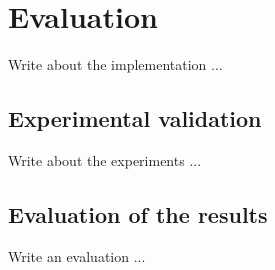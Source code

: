 \chapter{Evaluation}
\label{cha:evaluation}
\vspace{0.5 cm} 

Write about the implementation ...

\vspace{0.5 cm} 
\section{Experimental validation}
\label{sec:expval}
\vspace{0.5 cm} 

Write about the experiments ...


\vspace{0.5 cm} 
\section{Evaluation of the results}
\label{sec:evalres}
\vspace{0.5 cm} 

Write an evaluation ...
